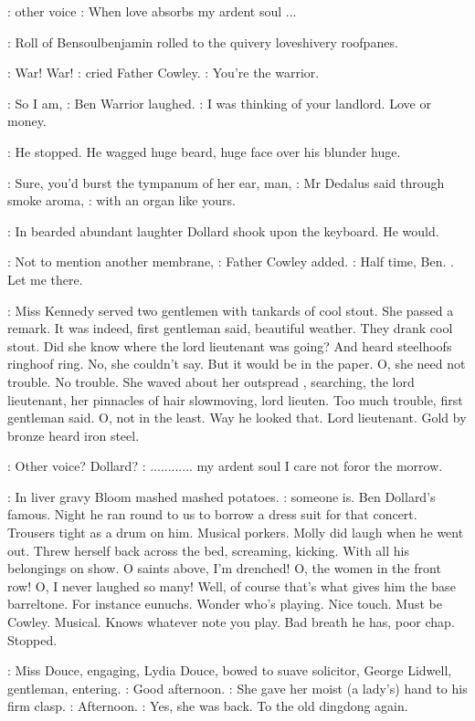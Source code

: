 \Stage:
other voice
\Song:
When love absorbs my ardent soul ...

:
Roll of Bensoulbenjamin rolled to the
quivery loveshivery roofpanes.

\Cowley:
War! War!
:
cried Father Cowley.
\Cowley:
You're the warrior.

\Dollard:
So I am,
:
Ben Warrior laughed.
\Dollard:
I was thinking of your landlord. Love or money.

:
He stopped. He wagged huge beard,
huge face over his blunder huge.

\Simon:
Sure, you'd burst the tympanum of her ear, man,
:
Mr Dedalus said through smoke aroma,
\Simon:
with an organ like yours.

:
In bearded abundant laughter Dollard shook upon the keyboard.
He would.

\Cowley:
Not to mention another membrane,
:
Father Cowley added.
\Cowley:
Half time, Ben. .
Let me there.

:
Miss Kennedy served two gentlemen with tankards of cool stout. She
passed a remark. It was indeed, first gentleman said, beautiful weather.
They drank cool stout. Did she know where the lord lieutenant was going?
And heard steelhoofs ringhoof ring. No, she couldn't say. But it would be
in the paper. O, she need not trouble. No trouble. She waved about her
outspread , searching,
the lord lieutenant, her pinnacles of
hair slowmoving, lord lieuten. Too much trouble, first gentleman said. O,
not in the least. Way he looked that. Lord lieutenant. Gold by bronze
heard iron steel.%

\Stage:
Other voice? Dollard?
\Song:
............ my ardent soul
    I care not foror the morrow.

:
In liver gravy Bloom mashed mashed potatoes.
\BloomInt:
someone is. Ben Dollard's famous. Night he ran round to us to borrow a
dress suit for that concert. Trousers tight as a drum on him. Musical
porkers. Molly did laugh when he went out. Threw herself back across the
bed, screaming, kicking. With all his belongings on show. O saints above,
I'm drenched! O, the women in the front row! O, I never laughed so many!
Well, of course that's what gives him the base barreltone. For instance
eunuchs.
Wonder who's playing. Nice touch. Must be Cowley. Musical.
Knows whatever note you play. Bad breath he has, poor chap. Stopped.

:
Miss Douce, engaging, Lydia Douce, bowed to suave solicitor, George
Lidwell, gentleman, entering.
\Lidwell:
Good afternoon.
:
She gave her moist (a lady's) hand to his firm clasp.
\MissD:
Afternoon.
:
Yes, she was back. To the old dingdong again.

